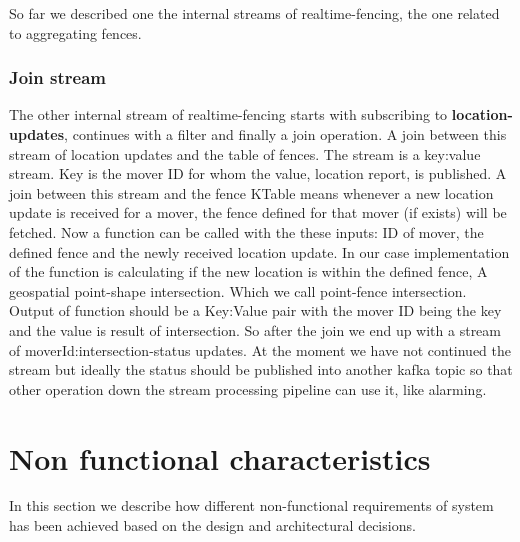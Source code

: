 \documentclass[a4]{report}
\begin{document}
    So far we described one the internal streams of realtime-fencing, the one related to aggregating fences.

    \subsubsection{Join stream}
    The other internal stream of realtime-fencing starts with subscribing to \textbf{location-updates}, continues with a
    filter and finally a join operation.
    A join between this stream of location updates and the table of fences.
    The stream is a key:value stream.
    Key is the mover ID for whom the value, location report, is published.
    A join between this stream and the fence KTable means whenever a new location update is received for a mover,
    the fence defined for that mover (if exists) will be fetched.
    Now a function can be called with the these inputs: ID of mover, the defined fence and the newly received location update.
    In our case implementation of the function is calculating if the new location is within the defined fence, A
    geospatial point-shape intersection.
    Which we call point-fence intersection.
    Output of function should be a Key:Value pair with the mover ID being the key and the value is result of
    intersection.
    So after the join we end up with a stream of moverId:intersection-status updates.
    At the moment we have not continued the stream but ideally the status should be published into another kafka
    topic so that other operation down the stream processing pipeline can use it, like alarming.



    \section{Non functional characteristics}
    In this section we describe how different non-functional requirements of system has been achieved based on the
    design and architectural decisions.
\end{document}
